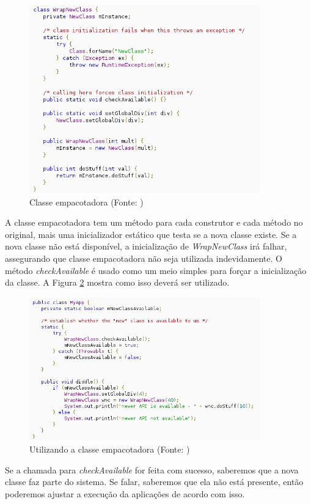 \begin{figure}[h]
    \centering
    \includegraphics[width=10cm]{img/wrapper2}
    \caption{Classe empacotadora (Fonte: \cite{back_compat})}
    \label{wrapper2}
\end{figure}

A classe empacotadora tem um método para cada construtor e cada método no original,
mais uma inicializador estático que testa se a nova classe existe. Se a nova classe
não está disponível, a inicialização de {\it WrapNewClass} irá falhar, assegurando
que classe empacotadora não seja utilizada indevidamente. O método {\it checkAvailable} 
é usado como um meio simples para forçar a inicialização da classe. A Figura \ref{wrapper3}
mostra como isso deverá ser utilizado.

\begin{figure}[h]
    \centering
    \includegraphics[width=10cm]{img/wrapper3}
    \caption{Utilizando a classe empacotadora (Fonte: \cite{back_compat})}
    \label{wrapper3}
\end{figure}

Se a chamada para {\it checkAvailable} for feita com sucesso, saberemos que a nova
classe faz parte do sistema. Se falar, saberemos que ela não está presente, então
poderemos ajustar a execução da aplicações de acordo com isso.

